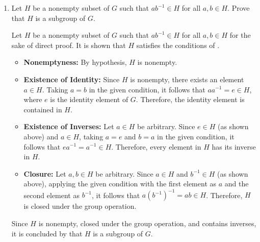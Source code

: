 \begin{enumerate}
\begin{subprove}
    In both cases, it is shown that $G$ is cyclic.
    Since $g$ was an arbitrary non-identity element of $G$ in Case 2, 
    it follows that every non-identity element of $G$ generates $G$.
  \end{subprove}







  
  \item Let $H$ be a nonempty subset of $G$ such that $a b^{-1} \in H$ for all $a, b \in H$. Prove that $H$ is a subgroup of $G$.
  \begin{subprove}
    Let $H$ be a nonempty subset of $G$ such that $a b^{-1} \in H$ for all $a, b \in H$ for the sake of direct proof.
    It is shown that $H$ satisfies the conditions of .
    
    \begin{itemize}
      \item \textbf{Nonemptyness:} By hypothesis, $H$ is nonempty.
      
      \item \textbf{Existence of Identity:} Since $H$ is nonempty, there exists an element $a \in H$.
      Taking $a = b$ in the given condition, it follows that $a a^{-1} = e \in H$, where $e$ is the identity element of $G$.
      Therefore, the identity element is contained in $H$.
      
      \item \textbf{Existence of Inverses:} Let $a \in H$ be arbitrary.
      Since $e \in H$ (as shown above) and $a \in H$, taking $a = e$ and $b = a$ in the given condition, 
      it follows that $e a^{-1} = a^{-1} \in H$.
      Therefore, every element in $H$ has its inverse in $H$.
      
      \item \textbf{Closure:} Let $a, b \in H$ be arbitrary.
      Since $a \in H$ and $b^{-1} \in H$ (as shown above), applying the given condition with the first element as $a$ and the second element as $b^{-1}$,
      it follows that $a (b^{-1})^{-1} = a b \in H$.
      Therefore, $H$ is closed under the group operation.
    \end{itemize}
    
    Since $H$ is nonempty, closed under the group operation, and contains inverses, 
    it is concluded by  that $H$ is a subgroup of $G$.
  \end{subprove}









\end{enumerate}
